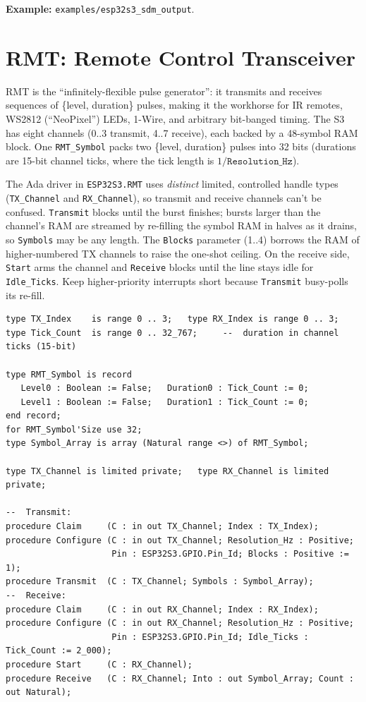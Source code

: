 \noindent\textbf{Example:} \texttt{examples/esp32s3\_sdm\_output}.

\section{RMT: Remote Control Transceiver}
\label{app:int:rmt}

RMT is the ``infinitely-flexible pulse generator'': it transmits and receives
sequences of \{level, duration\} pulses, making it the workhorse for IR remotes,
WS2812 (``NeoPixel'') LEDs, 1-Wire, and arbitrary bit-banged timing. The S3 has
eight channels (0..3 transmit, 4..7 receive), each backed by a 48-symbol RAM
block. One \texttt{RMT\_Symbol} packs two \{level, duration\} pulses into 32 bits
(durations are 15-bit channel ticks, where the tick length is
$1/\texttt{Resolution\_Hz}$).

The Ada driver in \texttt{ESP32S3.RMT} uses \emph{distinct} limited, controlled
handle types (\texttt{TX\_Channel} and \texttt{RX\_Channel}), so transmit and
receive channels can't be confused. \texttt{Transmit} blocks until the burst
finishes; bursts larger than the channel's RAM are streamed by re-filling the
symbol RAM in halves as it drains, so \texttt{Symbols} may be any length. The
\texttt{Blocks} parameter (1..4) borrows the RAM of higher-numbered TX channels
to raise the one-shot ceiling. On the receive side, \texttt{Start} arms the
channel and \texttt{Receive} blocks until the line stays idle for
\texttt{Idle\_Ticks}. Keep higher-priority interrupts short because \texttt{Transmit} busy-polls its
re-fill.

\begin{lstlisting}
type TX_Index    is range 0 .. 3;   type RX_Index is range 0 .. 3;
type Tick_Count  is range 0 .. 32_767;     --  duration in channel ticks (15-bit)

type RMT_Symbol is record
   Level0 : Boolean := False;   Duration0 : Tick_Count := 0;
   Level1 : Boolean := False;   Duration1 : Tick_Count := 0;
end record;
for RMT_Symbol'Size use 32;
type Symbol_Array is array (Natural range <>) of RMT_Symbol;

type TX_Channel is limited private;   type RX_Channel is limited private;

--  Transmit:
procedure Claim     (C : in out TX_Channel; Index : TX_Index);
procedure Configure (C : in out TX_Channel; Resolution_Hz : Positive;
                     Pin : ESP32S3.GPIO.Pin_Id; Blocks : Positive := 1);
procedure Transmit  (C : TX_Channel; Symbols : Symbol_Array);
--  Receive:
procedure Claim     (C : in out RX_Channel; Index : RX_Index);
procedure Configure (C : in out RX_Channel; Resolution_Hz : Positive;
                     Pin : ESP32S3.GPIO.Pin_Id; Idle_Ticks : Tick_Count := 2_000);
procedure Start     (C : RX_Channel);
procedure Receive   (C : RX_Channel; Into : out Symbol_Array; Count : out Natural);
\end{lstlisting}

